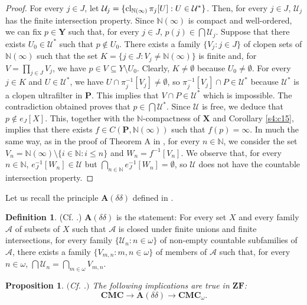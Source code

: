 \documentclass[12pt,twoside,leqno]{article}
\theoremstyle{plain}
\newtheorem{proposition}[theorem]{Proposition}
\theoremstyle{definition}
\newtheorem{definition}[theorem]{Definition}
\theoremstyle{remark}
\DeclareMathOperator{\cl}{{\rm cl}}
\begin{document}
\begin{proof}
	For every $j\in J$, let $\mathcal{U}_j=\{\cl_{\mathbb{N}(\infty)}\pi_j[U]: U\in\mathcal{U}^{\ast}\}$. Then, for every $j\in J$,  $\mathcal{U}_j$ has the finite intersection property.  Since $\mathbb{N}(\infty)$ is compact and well-ordered, we can fix $p\in\mathbf{Y}$ such that, for every $j\in J$, $p(j)\in\bigcap\mathcal{U}_j$. Suppose that there exists $U_0\in\mathcal{U}^{\ast}$ such that $p\notin U_0$. There exists a family $\{V_j: j\in J\}$ of clopen sets of $\mathbb{N}(\infty)$ such that the set $K=\{j\in J: V_j\neq \mathbb{N}(\infty)\}$ is finite and, for $V=\prod\limits_{j\in J}V_j$, we have $p\in V\subseteq Y\setminus U_0$. Clearly, $K\neq\emptyset$ because $U_0\neq\emptyset$. For every $j\in K$ and $U\in\mathcal{U}^{\ast}$, we have $U\cap \pi_j^{-1}[V_j]\neq\emptyset$, so $\pi_j^{-1}[V_j]\cap P\in\mathcal{U}^{\ast}$ because $\mathcal{U}^{\ast}$ is a clopen ultrafilter in $\mathbf{P}$. This implies that $V\cap P\in\mathcal{U}^{\ast}$ which is impossible. The contradiction obtained proves that $p\in\bigcap\mathcal{U}^{\ast}$. Since $\mathcal{U}$ is free, we deduce that $p\notin e_J[X]$. This, together with the $\mathbb{N}$-compactness of $\mathbf{X}$ and Corollary \ref{s4:c15}, implies that there exists $f\in C(\mathbf{P}, \mathbb{N}(\infty))$ such that $f(p)=\infty$. In much the same way, as in the proof of Theorem A in \cite{Chew}, for every $n\in\mathbb{N}$, we consider the set $V_n=\mathbb{N}(\infty)\setminus\{i\in\mathbb{N}: i\leq n\}$ and $W_n=f^{-1}[V_n]$. We observe that, for every $n\in\mathbb{N}$,  $e_J^{-1}[W_n]\in\mathcal{U}$ but $\bigcap\limits_{n\in\mathbb{N}}e_J^{-1}[W_n]=\emptyset$, so $\mathcal{U}$ does not have the countable intersection property. 
\end{proof}

Let us recall the principle $\mathbf{A}(\delta\delta)$ defined in \cite{kow}.

\begin{definition}
	\label{s6:d2}
	(Cf. \cite[Definition 1.7(4)]{kow}.) $\mathbf{A}(\delta\delta)$ is the statement: For every set $X$ and every family $\mathcal{A}$ of subsets of $X$ such that $\mathcal{A}$ is closed under finite unions and finite intersections, for every family $\{\mathcal{U}_n: n\in\omega\}$ of non-empty countable subfamilies of $\mathcal{A}$, there exists a family $\{V_{m,n}: m,n\in\omega\}$ of members of $\mathcal{A}$ such that, for every $n\in\omega$, $\bigcap\mathcal{U}_n=\bigcap\limits_{m\in\omega}V_{m,n}$. 
\end{definition}

\begin{proposition}
	\label{s6:p3}
	$($Cf. \cite[Theorem 2.9]{kow}.$)$ The following implications are true in $\mathbf{ZF}$:
	$$\mathbf{CMC}\rightarrow \mathbf{A}(\delta\delta)\rightarrow \mathbf{CMC}_{\omega}.$$
\end{proposition}
\end{document}
